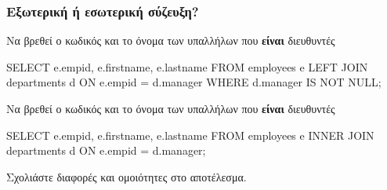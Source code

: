 \begin{frame}
\frametitle{Εξωτερική ή εσωτερική σύζευξη?}
\begin{minipage}{\wE}
\vspace{-0.5cm}
\begin{block}{\footnotesize Να βρεθεί ο κωδικός και το όνομα των υπαλλήλων που {\bf είναι} διευθυντές}
\en
\begin{SQL}
  SELECT e.empid, e.firstname, e.lastname
    FROM employees e LEFT JOIN departments d
         ON e.empid = d.manager
   WHERE d.manager IS NOT NULL;
\end{SQL}
\end{block}
\el
\vspace{-0.2cm}
\pause
\begin{block}{\footnotesize  Να βρεθεί ο κωδικός και το όνομα των υπαλλήλων που {\bf είναι}  διευθυντές}
\en
\begin{SQL}
  SELECT e.empid, e.firstname, e.lastname
    FROM employees e INNER JOIN departments d
         ON e.empid = d.manager;
\end{SQL}
\end{block}
\par {\crr Σχολιάστε διαφορές και ομοιότητες στο αποτέλεσμα.}
\end{minipage}
\end{frame}
